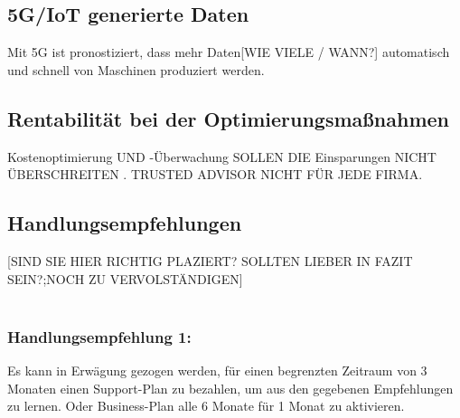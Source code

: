 \subsection*{5G/IoT generierte Daten}
Mit 5G ist pronostiziert, dass mehr Daten[WIE VIELE / WANN?] automatisch und schnell von Maschinen produziert werden.
\\
\subsection*{Rentabilität bei der Optimierungsmaßnahmen}
Kostenoptimierung UND -Überwachung SOLLEN DIE Einsparungen NICHT ÜBERSCHREITEN . 
TRUSTED ADVISOR NICHT FÜR JEDE FIRMA.

\subsection*{Handlungsempfehlungen}
[SIND SIE HIER RICHTIG PLAZIERT? SOLLTEN LIEBER IN FAZIT SEIN?;NOCH ZU VERVOLSTÄNDIGEN]
\\\\
\subsubsection*{Handlungsempfehlung 1:} 
Es kann in Erwägung gezogen werden, für einen begrenzten Zeitraum von 3 Monaten einen Support-Plan zu bezahlen, um aus den gegebenen Empfehlungen zu lernen. Oder Business-Plan alle 6 Monate für 1 Monat zu aktivieren.  
\\\\
